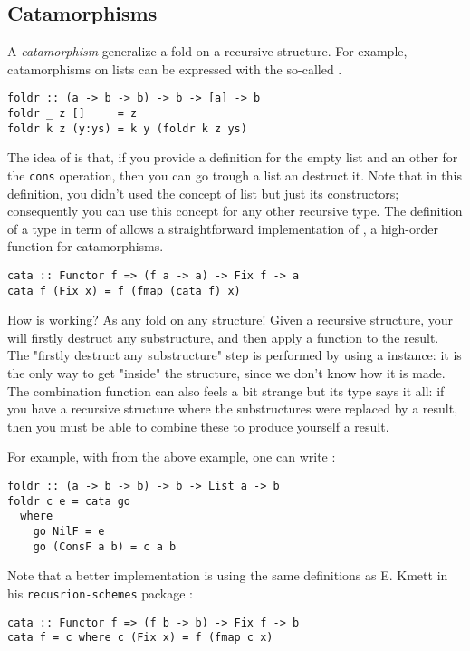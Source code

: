 \subsection{Catamorphisms}
A \emph{catamorphism} generalize a fold on a recursive structure. For example, catamorphisms on lists can be expressed with the so-called .
\begin{verbatim}
foldr :: (a -> b -> b) -> b -> [a] -> b
foldr _ z []     = z
foldr k z (y:ys) = k y (foldr k z ys)
\end{verbatim}
The idea of  is that, if you provide a definition for the empty list and an other for the \verb|cons| operation, then you can go trough a list an destruct it. Note that in this definition, you didn't used the concept of list but just its constructors; consequently you can use this concept for any other recursive type. The definition of a type in term of  allows a straightforward implementation of , a high-order function for catamorphisms.

\begin{verbatim}
cata :: Functor f => (f a -> a) -> Fix f -> a
cata f (Fix x) = f (fmap (cata f) x)
\end{verbatim}
\noindent How  is working? As any fold on any structure! Given a recursive structure, your will firstly destruct any substructure, and then apply a function to the result. The "firstly destruct any substructure" step is performed by using a  instance: it is the only way to get "inside" the structure, since we don't know how it is made. The combination function can also feels a bit strange but its type says it all: if you have a recursive structure where the substructures were replaced by a result, then you must be able to combine these to produce yourself a result.

For example, with  from the above example, one can write :
\begin{verbatim}
foldr :: (a -> b -> b) -> b -> List a -> b
foldr c e = cata go
  where
    go NilF = e
    go (ConsF a b) = c a b
\end{verbatim}

\noindent Note that a better implementation is using the same definitions as E. Kmett in his \verb|recusrion-schemes| package \cite{ekmett:eschems}:

\begin{verbatim}
cata :: Functor f => (f b -> b) -> Fix f -> b
cata f = c where c (Fix x) = f (fmap c x)
\end{verbatim}

